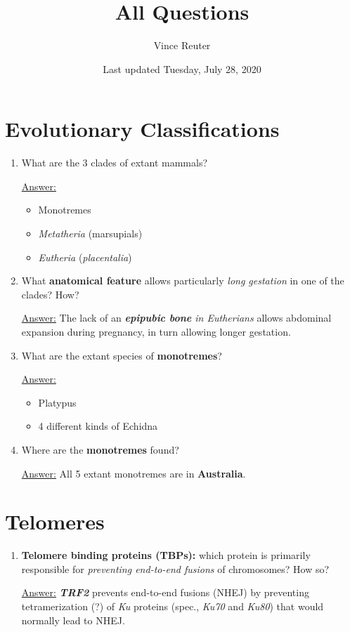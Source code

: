 \documentclass{article}
\title{All Questions}
\author{Vince Reuter}
\date{Last updated Tuesday, July 28, 2020}
\newenvironment{QandA}{\begin{enumerate}[label=\bfseries Q\arabic*.]}
                       {\end{enumerate}}
\newenvironment{answered}{\par\normalfont\underline{Answer:}}{}
\begin{document}
\maketitle

\tableofcontents

\section{Evolutionary Classifications}
\begin{QandA}
  \item{What are the 3 clades of extant mammals?}
    \begin{answered}
    \begin{itemize}
      \item{Monotremes}
      \item{\textit{Metatheria} (marsupials)}
      \item{\textit{Eutheria} (\textit{placentalia})}
    \end{itemize}
    \end{answered}
  \item{What \textbf{anatomical feature} allows particularly \textit{long gestation} in one of the clades? How?}
    \begin{answered}
    The lack of an \textit{\textbf{epipubic bone} in Eutherians} allows abdominal expansion during pregnancy, in turn allowing longer gestation.
    \end{answered}
  \item{What are the extant species of \textbf{monotremes}?}
    \begin{answered}
    \begin{itemize}
      \item{Platypus}
      \item{4 different kinds of Echidna}
    \end{itemize}
    \end{answered}
  \item{Where are the \textbf{monotremes} found?}
    \begin{answered}
    All 5 extant monotremes are in \textbf{Australia}.
    \end{answered}
\end{QandA}
\section{Telomeres}
\begin{QandA}
  \item{\textbf{Telomere binding proteins (TBPs):} which protein is primarily responsible for \textit{preventing end-to-end fusions} of chromosomes? How so?}
    \begin{answered}
    \textbf{\textit{TRF2}} prevents end-to-end fusions (NHEJ) by preventing tetramerization (?) of \textit{Ku} proteins (spec., \textit{Ku70} and \textit{Ku80}) that would normally lead to NHEJ.
    \end{answered}
\end{QandA}
\end{document}
